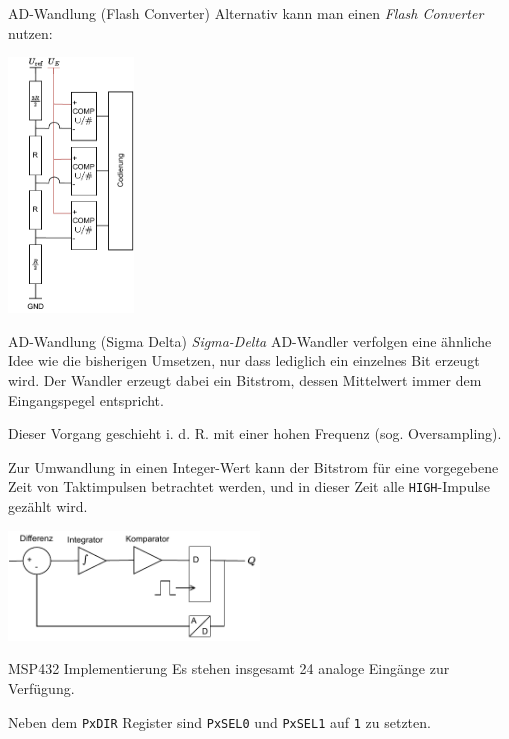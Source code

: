 \begin{defi}{AD-Wandlung (Flash Converter)}
    Alternativ kann man einen \emph{Flash Converter} nutzen:

    \begin{center}
        \includegraphics[width=0.25\textwidth]{includes/figures/defi_ad_flash_converter.pdf}
    \end{center}
\end{defi}

\begin{defi}{AD-Wandlung (Sigma Delta)}
    \emph{Sigma-Delta} AD-Wandler verfolgen eine ähnliche Idee wie die bisherigen Umsetzen, nur dass lediglich ein einzelnes Bit erzeugt wird.
    Der Wandler erzeugt dabei ein Bitstrom, dessen Mittelwert immer dem Eingangspegel entspricht.

    Dieser Vorgang geschieht i. d. R. mit einer hohen Frequenz (sog. Oversampling).

    Zur Umwandlung in einen Integer-Wert kann der Bitstrom für eine vorgegebene Zeit von Taktimpulsen betrachtet werden, und in dieser Zeit alle \texttt{HIGH}-Impulse gezählt wird.

    \begin{center}
        \includegraphics[width=0.5\textwidth]{includes/figures/defi_ad_sigma_delta.pdf}
    \end{center}
\end{defi}

\begin{bonus}{MSP432 Implementierung}
    Es stehen insgesamt 24 analoge Eingänge zur Verfügung.

    Neben dem \texttt{PxDIR} Register sind \texttt{PxSEL0} und \texttt{PxSEL1} auf \texttt{1} zu setzten.
\end{bonus}